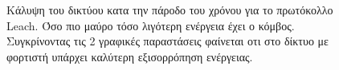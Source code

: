 \begin{figure}[H]
  \centering
  \caption{Κάλυψη του δικτύου κατα την πάροδο του χρόνου για το πρωτόκολλο Leach. Όσο πιο μαύρο τόσο λιγότερη ενέργεια έχει ο κόμβος. Συγκρίνοντας τις 2 γραφικές
παραστάσεις φαίνεται οτι στο δίκτυο με φορτιστή υπάρχει καλύτερη εξισορρόπηση ενέργειας.}
  \label{fig:1exp_4_2}
\end{figure}

